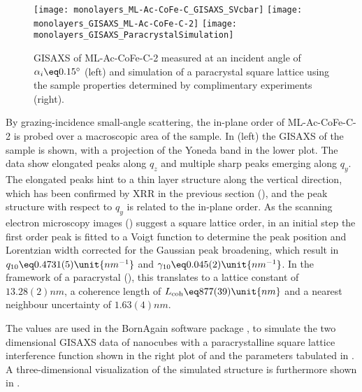 \documentclass[\main/dresen_thesis.tex]{subfiles}
\begin{document}
  \label{sec:monolayers:structure:squareArrayParacrystalGISAXS}
  \begin{figure}[tb]
    \centering
    \texttt{[image: monolayers\_ML-Ac-CoFe-C\_GISAXS\_SVcbar]}
    \texttt{[image: monolayers\_GISAXS\_ML-Ac-CoFe-C-2]}
    \texttt{[image: monolayers\_GISAXS\_ParacrystalSimulation]}
    \caption{\label{fig:monolayers:structure:ML-Ac-CoFe-C-2:GISAXS}GISAXS of ML-Ac-CoFe-C-2 measured at an incident angle of $\alpha_i \eq 0.15^\circ$ (left) and simulation of a paracrystal square lattice using the sample properties determined by complimentary experiments (right).}
  \end{figure}
  By grazing-incidence small-angle scattering, the in-plane order of ML-Ac-CoFe-C-2 is probed over a macroscopic area of the sample.
  In  (left) the GISAXS of the sample is shown, with a projection of  the Yoneda band in the lower plot.
  The data show elongated peaks along $\mathit{q_z}$ and multiple sharp peaks emerging along $\mathit{q_y}$.
  The elongated peaks hint to a thin layer structure along the vertical direction, which has been confirmed by XRR in the previous section (), and the peak structure with respect to $\mathit{q_y}$ is related to the in-plane order.
  As the scanning electron microscopy images () suggest a square lattice order, in an initial step the first order peak is fitted to a Voigt function to determine the peak position and Lorentzian width corrected for the Gaussian peak broadening,  which result in $q_{10} \eq 0.4731(5) \unit{nm^{-1}}$ and $\gamma_{10} \eq 0.045(2) \unit{nm^{-1}}$.
  In the framework of a paracrystal (), this translates to a lattice constant of $13.28(2) \unit{nm}$, a coherence length of $L_{\mathrm{coh}} \eq 877(39) \unit{nm}$ and a nearest neighbour uncertainty of $1.63(4) \unit{nm}$.

  The values are used in the BornAgain software package \cite{Burle_2018_borna}, to simulate the two dimensional GISAXS data of nanocubes with a paracrystalline square lattice interference function shown in the right plot of  and the parameters tabulated in .
  A three-dimensional visualization of the simulated structure is furthermore shown in .
\end{document}
